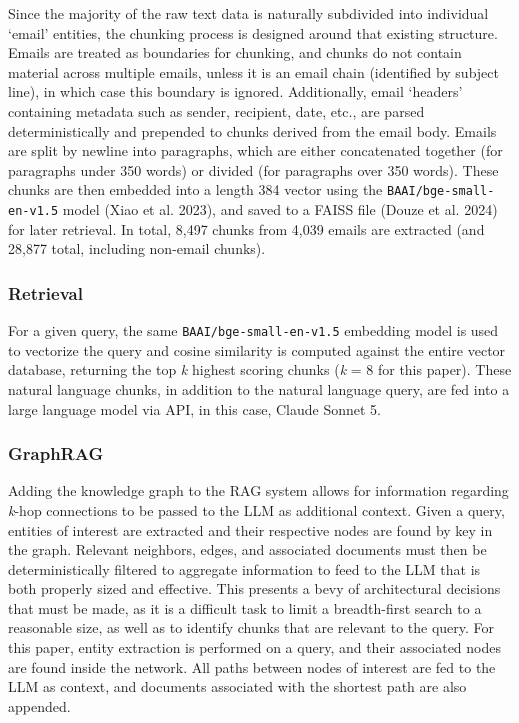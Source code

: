 \documentclass[
  letterpaper,
  DIV=11,
  numbers=noendperiod]{scrartcl}
\begin{document}
Since the majority of the raw text data is naturally subdivided into
individual `email' entities, the chunking process is designed around
that existing structure. Emails are treated as boundaries for chunking,
and chunks do not contain material across multiple emails, unless it is
an email chain (identified by subject line), in which case this boundary
is ignored. Additionally, email `headers' containing metadata such as
sender, recipient, date, etc., are parsed deterministically and
prepended to chunks derived from the email body. Emails are split by
newline into paragraphs, which are either concatenated together (for
paragraphs under 350 words) or divided (for paragraphs over 350 words).
These chunks are then embedded into a length 384 vector using the
\texttt{BAAI/bge-small-en-v1.5} model (Xiao et al. 2023), and saved to a
FAISS file (Douze et al. 2024) for later retrieval. In total, 8,497
chunks from 4,039 emails are extracted (and 28,877 total, including
non-email chunks).

\subsubsection{Retrieval}\label{retrieval}

For a given query, the same \texttt{BAAI/bge-small-en-v1.5} embedding
model is used to vectorize the query and cosine similarity is computed
against the entire vector database, returning the top \emph{k} highest
scoring chunks (\emph{k} = 8 for this paper). These natural language
chunks, in addition to the natural language query, are fed into a large
language model via API, in this case, Claude Sonnet 5.

\subsubsection{GraphRAG}\label{graphrag}

Adding the knowledge graph to the RAG system allows for information
regarding \emph{k}-hop connections to be passed to the LLM as additional
context. Given a query, entities of interest are extracted and their
respective nodes are found by key in the graph. Relevant neighbors,
edges, and associated documents must then be deterministically filtered
to aggregate information to feed to the LLM that is both properly sized
and effective. This presents a bevy of architectural decisions that must
be made, as it is a difficult task to limit a breadth-first search to a
reasonable size, as well as to identify chunks that are relevant to the
query. For this paper, entity extraction is performed on a query, and
their associated nodes are found inside the network. All paths between
nodes of interest are fed to the LLM as context, and documents
associated with the shortest path are also appended.
\end{document}
